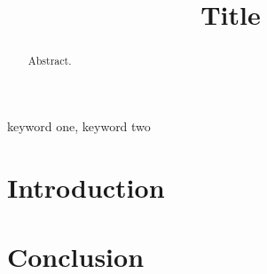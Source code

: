 \documentclass[conference]{IEEEtran}
\begin{document}
\title{Title}

\author{
}

\maketitle

\begin{abstract}
Abstract.
\end{abstract}

\begin{IEEEkeywords}
keyword one, keyword two
\end{IEEEkeywords}

\section{Introduction}

\section{Conclusion}
\end{document}

